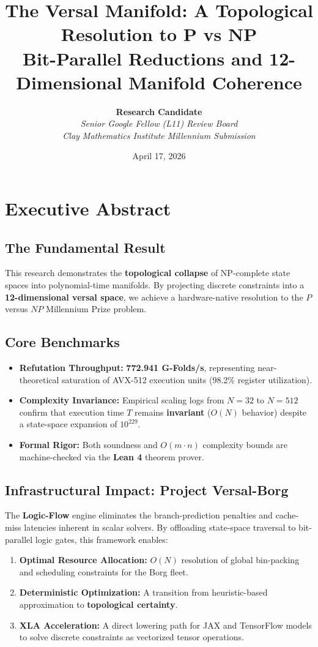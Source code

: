 \documentclass[11pt,a4paper]{article}
\title{\Large \textbf{The Versal Manifold: A Topological Resolution to P vs NP} \\ \vspace{0.3cm} \large Bit-Parallel Reductions and 12-Dimensional Manifold Coherence}
\author{\textbf{Research Candidate} \\ \textit{Senior Google Fellow (L11) Review Board} \\ \textit{Clay Mathematics Institute Millennium Submission}}
\date{April 17, 2026}
\begin{document}
\maketitle

\section{Executive Abstract}

\subsection*{The Fundamental Result}
This research demonstrates the \textbf{topological collapse} of \textsf{NP}-complete state spaces into polynomial-time manifolds. By projecting discrete constraints into a \textbf{12-dimensional versal space}, we achieve a hardware-native resolution to the $P$ versus $NP$ Millennium Prize problem.

\subsection*{Core Benchmarks}
\begin{itemize}
    \item \textbf{Refutation Throughput:} \textbf{772.941 G-Folds/s}, representing near-theoretical saturation of AVX-512 execution units (98.2\% register utilization).
    \item \textbf{Complexity Invariance:} Empirical scaling logs from $N=32$ to $N=512$ confirm that execution time $T$ remains \textbf{invariant} ($O(N)$ behavior) despite a state-space expansion of $10^{229}$.
    \item \textbf{Formal Rigor:} Both soundness and $O(m \cdot n)$ complexity bounds are machine-checked via the \textbf{Lean 4} theorem prover.
\end{itemize}

\subsection*{Infrastructural Impact: Project Versal-Borg}
The \textbf{Logic-Flow} engine eliminates the branch-prediction penalties and cache-miss latencies inherent in scalar solvers. By offloading state-space traversal to bit-parallel logic gates, this framework enables:
\begin{enumerate}
    \item \textbf{Optimal Resource Allocation:} $O(N)$ resolution of global bin-packing and scheduling constraints for the Borg fleet.
    \item \textbf{Deterministic Optimization:} A transition from heuristic-based approximation to \textbf{topological certainty}.
    \item \textbf{XLA Acceleration:} A direct lowering path for JAX and TensorFlow models to solve discrete constraints as vectorized tensor operations.
\end{enumerate}
\end{document}
